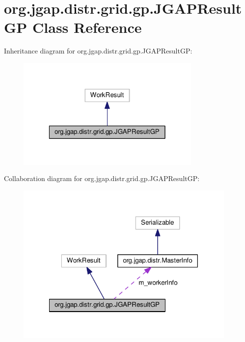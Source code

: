 \hypertarget{classorg_1_1jgap_1_1distr_1_1grid_1_1gp_1_1_j_g_a_p_result_g_p}{\section{org.\-jgap.\-distr.\-grid.\-gp.\-J\-G\-A\-P\-Result\-G\-P Class Reference}
\label{classorg_1_1jgap_1_1distr_1_1grid_1_1gp_1_1_j_g_a_p_result_g_p}
}


Inheritance diagram for org.\-jgap.\-distr.\-grid.\-gp.\-J\-G\-A\-P\-Result\-G\-P\-:
\nopagebreak
\begin{figure}[H]
\begin{center}
\leavevmode
\includegraphics[width=256pt]{classorg_1_1jgap_1_1distr_1_1grid_1_1gp_1_1_j_g_a_p_result_g_p__inherit__graph}
\end{center}
\end{figure}


Collaboration diagram for org.\-jgap.\-distr.\-grid.\-gp.\-J\-G\-A\-P\-Result\-G\-P\-:
\nopagebreak
\begin{figure}[H]
\begin{center}
\leavevmode
\includegraphics[width=306pt]{classorg_1_1jgap_1_1distr_1_1grid_1_1gp_1_1_j_g_a_p_result_g_p__coll__graph}
\end{center}
\end{figure}

